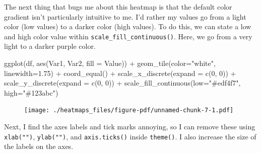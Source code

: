 \documentclass[
  letterpaper,
  DIV=11,
  numbers=noendperiod]{scrreprt}
\newenvironment{Shaded}{\begin{snugshade}}{\end{snugshade}}
\newcommand{\AttributeTok}[1]{\textcolor[rgb]{0.40,0.45,0.13}{#1}}
\newcommand{\DecValTok}[1]{\textcolor[rgb]{0.68,0.00,0.00}{#1}}
\newcommand{\FloatTok}[1]{\textcolor[rgb]{0.68,0.00,0.00}{#1}}
\newcommand{\FunctionTok}[1]{\textcolor[rgb]{0.28,0.35,0.67}{#1}}
\newcommand{\NormalTok}[1]{\textcolor[rgb]{0.00,0.23,0.31}{#1}}
\newcommand{\SpecialCharTok}[1]{\textcolor[rgb]{0.37,0.37,0.37}{#1}}
\newcommand{\StringTok}[1]{\textcolor[rgb]{0.13,0.47,0.30}{#1}}
\begin{document}
The next thing that bugs me about this heatmap is that the default color
gradient isn't particularly intuitive to me. I'd rather my values go
from a light color (low values) to a darker color (high values). To do
this, we can state a low and high color value within
\texttt{scale\_fill\_continuous()}. Here, we go from a very light to a
darker purple color.

\begin{Shaded}
\begin{Highlighting}[]
\FunctionTok{ggplot}\NormalTok{(df, }\FunctionTok{aes}\NormalTok{(Var1, Var2, }\AttributeTok{fill =}\NormalTok{ Value)) }\SpecialCharTok{+} 
  \FunctionTok{geom\_tile}\NormalTok{(}\AttributeTok{color=}\StringTok{"white"}\NormalTok{, }\AttributeTok{linewidth=}\FloatTok{1.75}\NormalTok{) }\SpecialCharTok{+}
  \FunctionTok{coord\_equal}\NormalTok{() }\SpecialCharTok{+}
  \FunctionTok{scale\_x\_discrete}\NormalTok{(}\AttributeTok{expand =} \FunctionTok{c}\NormalTok{(}\DecValTok{0}\NormalTok{, }\DecValTok{0}\NormalTok{)) }\SpecialCharTok{+}
  \FunctionTok{scale\_y\_discrete}\NormalTok{(}\AttributeTok{expand =} \FunctionTok{c}\NormalTok{(}\DecValTok{0}\NormalTok{, }\DecValTok{0}\NormalTok{)) }\SpecialCharTok{+} 
  \FunctionTok{scale\_fill\_continuous}\NormalTok{(}\AttributeTok{low=}\StringTok{"\#edf4f7"}\NormalTok{, }\AttributeTok{high=}\StringTok{"\#123abc"}\NormalTok{)}
\end{Highlighting}
\end{Shaded}

\begin{figure}[H]

{\centering \texttt{[image: ./heatmaps\_files/figure-pdf/unnamed-chunk-7-1.pdf]}

}

\end{figure}

Next, I find the axes labels and tick marks annoying, so I can remove
these using \texttt{xlab("")}, \texttt{ylab("")}, and
\texttt{axis.ticks()} inside \texttt{theme()}. I also increase the size
of the labels on the axes.
\end{document}
